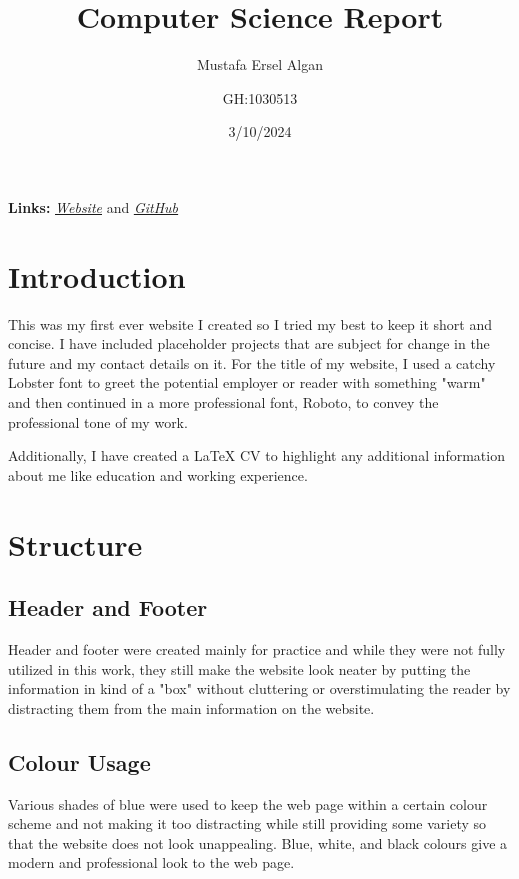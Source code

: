 \documentclass[twoside]{article}
\title{Computer Science Report}
\author{Mustafa Ersel Algan \and GH:1030513}
\date{3/10/2024}
\begin{document}
\maketitle{}

\noindent \textbf{Links:} 
\href{https://qwersel.github.io/ersel.github.io/Ersel%20Algan%20CS%20Project/Ersel%20Algan%20HTML%20Portfolio/Computer%20Science%20Portfolio.html}{\underline{\textit{Website}}} 
\textnormal{ and } 
\href{https://github.com/Qwersel/ersel.github.io/tree/4c633d38ef109d9e028325fb7ee654e1b4a1144e/Ersel%20Algan%20CS%20Project}{\underline{\textit{GitHub}}}

\section*{Introduction}
This was my first ever website I created so I tried my best to keep it short and concise. I have included placeholder projects that are subject for change in the future and my contact details on it. For the title of my website, I used a catchy Lobster font to greet the potential employer or reader with something "warm" and then continued in a more professional font, Roboto, to convey the professional tone of my work.

\vspace{1em}

\noindent Additionally, I have created a LaTeX CV to highlight any additional information about me like education and working experience.

\section*{Structure}
\subsection*{Header and Footer}
Header and footer were created mainly for practice and while they were not fully utilized in this work, they still make the website look neater by putting the information in kind of a "box" without cluttering or overstimulating the reader by distracting them from the main information on the website.

\subsection*{Colour Usage}
Various shades of blue were used to keep the web page within a certain colour scheme and not making it too distracting while still providing some variety so that the website does not look unappealing. Blue, white, and black colours give a modern and professional look to the web page.
\end{document}
